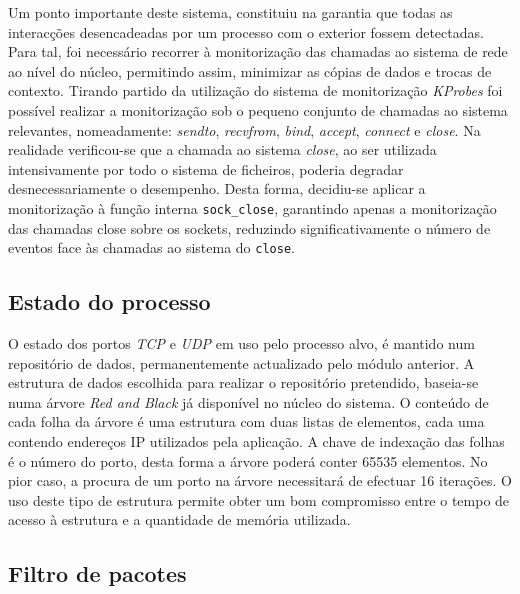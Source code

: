 \documentclass[a4paper]{llncs}
\newcommand{\td}[1]{\todo[inline]{#1}}
\begin{document}
Um ponto importante deste sistema, constituiu na garantia que todas as interacções desencadeadas por um processo com o exterior fossem detectadas.
 Para tal, foi necessário recorrer à monitorização das chamadas ao sistema de rede ao nível do núcleo, permitindo assim, minimizar as cópias de dados e trocas de contexto.
 Tirando partido da utilização do sistema de monitorização \textit{KProbes} foi possível realizar a monitorização sob o pequeno conjunto de chamadas ao sistema relevantes, nomeadamente: \textit{sendto}, \textit{recvfrom}, \textit{bind}, \textit{accept}, \textit{connect} e \textit{close}.
 Na realidade verificou-se que a chamada ao sistema \textit{close}, ao ser utilizada intensivamente por todo o sistema de ficheiros, poderia degradar desnecessariamente o desempenho.
 Desta forma, decidiu-se aplicar a monitorização à função interna \texttt{sock\_close}, garantindo apenas a monitorização das chamadas close sobre os sockets, reduzindo significativamente o número de eventos face às chamadas ao sistema do \texttt{close}.

\subsection*{Estado do processo}
\label{sub:data_repository}

O estado dos portos \textit{TCP} e \textit{UDP} em uso pelo processo alvo, é mantido num repositório de dados, permanentemente actualizado pelo módulo anterior. 
 A estrutura de dados escolhida para realizar o repositório pretendido, baseia-se numa árvore \textit{Red and Black} já disponível no núcleo do sistema.
 O conteúdo de cada folha da árvore é uma estrutura com duas listas de elementos, cada uma contendo endereços IP utilizados pela aplicação.
 A chave de indexação das folhas é o número do porto, desta forma a árvore poderá conter 65535 elementos.
 No pior caso, a procura de um porto na árvore necessitará de efectuar 16 iterações.
  O uso deste tipo de estrutura permite obter um bom compromisso entre o tempo de acesso à estrutura e a quantidade de memória utilizada.


\subsection*{Filtro de pacotes}
\label{sub:packet_filter}
\end{document}
